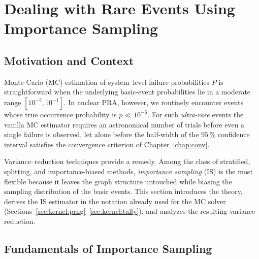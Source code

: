 \chapter{Dealing with Rare Events Using Importance Sampling}
\label{chap:is}

\section{Motivation and Context}

Monte-Carlo (MC) estimation of system–level failure probabilities \(P\) is
straightforward when the underlying basic‐event probabilities lie in a
moderate range \([10^{-5},10^{-1}]\).  In nuclear PRA, however, we routinely
encounter events whose true occurrence probability is \(p\ll10^{-6}\).  For
such \emph{ultra-rare} events the vanilla MC estimator requires an
astronomical number of trials before even a single failure is observed, let
alone before the half-width of the \(95\,\%\) confidence interval satisfies the
convergence criterion of Chapter~\ref{chap:conv}.  

Variance–reduction techniques provide a remedy.  Among the class of
stratified, splitting, and importance-biased methods, \emph{importance
sampling} (IS) is the most flexible because it leaves the graph structure
untouched while biasing the sampling distribution of the basic events.  This
section introduces the theory, derives the IS estimator in the notation
already used for the MC solver
(Sections~\ref{sec:kernel:prng}–\ref{sec:kernel:tally}), and analyzes the
resulting variance reduction.

\section{Fundamentals of Importance Sampling}
\label{sec:is:fundamentals}

